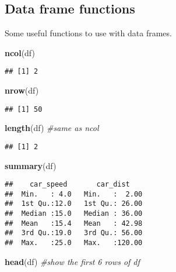 \documentclass[
]{article}
\newenvironment{Shaded}{\begin{snugshade}}{\end{snugshade}}
\newcommand{\CommentTok}[1]{\textcolor[rgb]{0.56,0.35,0.01}{\textit{#1}}}
\newcommand{\KeywordTok}[1]{\textcolor[rgb]{0.13,0.29,0.53}{\textbf{#1}}}
\newcommand{\NormalTok}[1]{#1}
\begin{document}
\hypertarget{data-frame-functions}{%
\subsection{Data frame functions}\label{data-frame-functions}}

Some useful functions to use with data frames.

\begin{Shaded}
\begin{Highlighting}[]
\KeywordTok{ncol}\NormalTok{(df)  }
\end{Highlighting}
\end{Shaded}

\begin{verbatim}
## [1] 2
\end{verbatim}

\begin{Shaded}
\begin{Highlighting}[]
\KeywordTok{nrow}\NormalTok{(df)  }
\end{Highlighting}
\end{Shaded}

\begin{verbatim}
## [1] 50
\end{verbatim}

\begin{Shaded}
\begin{Highlighting}[]
\KeywordTok{length}\NormalTok{(df)  }\CommentTok{#same as ncol}
\end{Highlighting}
\end{Shaded}

\begin{verbatim}
## [1] 2
\end{verbatim}

\begin{Shaded}
\begin{Highlighting}[]
\KeywordTok{summary}\NormalTok{(df)}
\end{Highlighting}
\end{Shaded}

\begin{verbatim}
##    car_speed       car_dist     
##  Min.   : 4.0   Min.   :  2.00  
##  1st Qu.:12.0   1st Qu.: 26.00  
##  Median :15.0   Median : 36.00  
##  Mean   :15.4   Mean   : 42.98  
##  3rd Qu.:19.0   3rd Qu.: 56.00  
##  Max.   :25.0   Max.   :120.00
\end{verbatim}

\begin{Shaded}
\begin{Highlighting}[]
\KeywordTok{head}\NormalTok{(df) }\CommentTok{#show the first 6 rows of df}
\end{Highlighting}
\end{Shaded}
\end{document}
